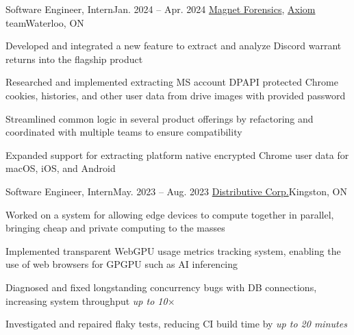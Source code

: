 \workEntry
{Software Engineer, Intern}{Jan. 2024 -- Apr. 2024}
{\href{https://www.magnetforensics.com/}{\linkIcon{} Magnet Forensics}, \href{https://www.magnetforensics.com/products/magnet-axiom/}{\linkIcon{} Axiom} team}{Waterloo, ON}
\begin{ResumeItem}
    \item{Developed and integrated a new feature to extract and analyze Discord warrant returns into the flagship product}
    \item{Researched and implemented extracting MS account DPAPI protected Chrome cookies, histories, and other user data from drive images with provided password}
    \item{Streamlined common logic in several product offerings by refactoring and coordinated with multiple teams to ensure compatibility}
    \item{Expanded support for extracting platform native encrypted Chrome user data for macOS, iOS, and Android}
\end{ResumeItem}


\workEntry
{Software Engineer, Intern}{May. 2023 -- Aug. 2023}
{\href{https://distributive.network/}{\linkIcon{} Distributive Corp.}}{Kingston, ON}
\begin{ResumeItem}
    \item{Worked on a system for allowing edge devices to compute together in parallel, bringing cheap and private computing to the masses}
    \item{Implemented transparent WebGPU usage metrics tracking system, enabling the use of web browsers for GPGPU such as AI inferencing}
    \item{Diagnosed and fixed longstanding concurrency bugs with DB connections, increasing system throughput \emph{up to 10\(\times\)}}
    \item{Investigated and repaired flaky tests, reducing CI build time by \emph{up to 20 minutes}}
\end{ResumeItem}

